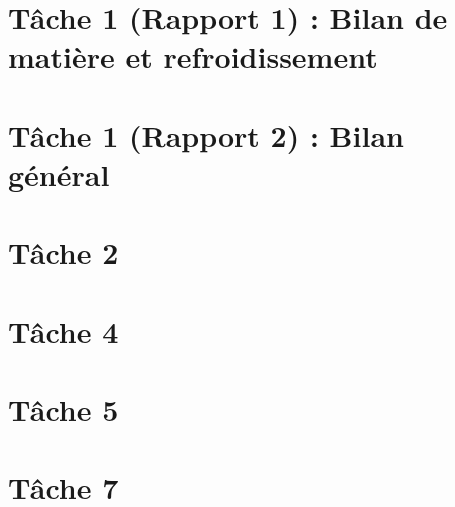 \documentclass[a4paper,oneside,12pt]{report}
\begin{document}


\tableofcontents

\chapter{T\^ache 1 (Rapport 1) : Bilan de matière et refroidissement}


\chapter{T\^ache 1 (Rapport 2) : Bilan général} 
\chapter{T\^ache 2}


\chapter{T\^ache 4}


\chapter{T\^ache 5}


\chapter{T\^ache 7}


\nocite{*}
\printbibliography
\end{document}
